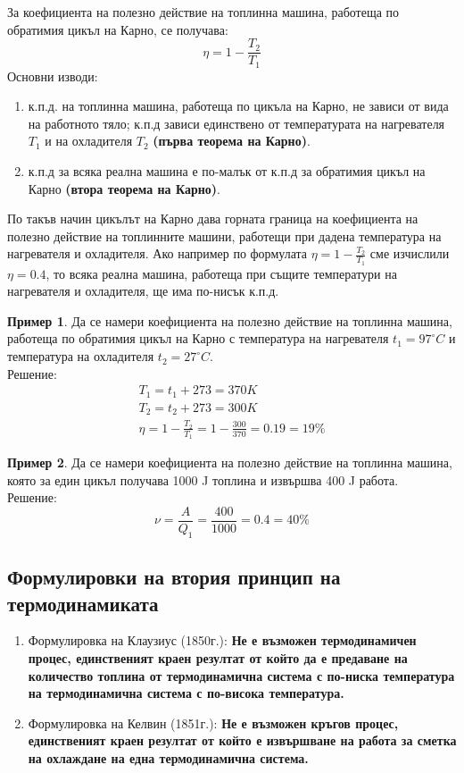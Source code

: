\documentclass[fleqn, 12pt]{article}
\theoremstyle{definition}
\newtheorem{example}{Пример}[subsection]
\begin{document}
За коефициента на полезно действие на топлинна машина, работеща по обратимия цикъл на Карно, се получава: 
$$\eta = 1 - \frac{T_2}{T_1}$$
Основни изводи: 
\begin{enumerate}
\item к.п.д. на топлинна машина, работеща по цикъла на Карно, не зависи от вида на
работното тяло; к.п.д зависи единствено от температурата на нагревателя $T_1$ и на
охладителя $T_2$ \textbf{(първа теорема на Карно)}.
\item к.п.д за всяка реална машина е по-малък от к.п.д за обратимия цикъл на Карно \textbf{(втора теорема на Карно)}.
\end{enumerate}
По такъв начин цикълът на Карно дава горната граница на коефициента на
полезно действие на топлинните машини, работещи при дадена температура на
нагревателя и охладителя. Ако например по формулата $\eta = 1 - \frac{T_2}{T_1}$ сме изчислили $\eta = 0.4$, 
то всяка реална машина, работеща при същите температури на нагревателя и охладителя, ще има по-нисък к.п.д.

\begin{example}
Да се намери коефициента на полезно действие на топлинна машина,
работеща по обратимия цикъл на Карно с температура на нагревателя
$t_1 = 97^\circ C $ и температура на охладителя $t_2 = 27^\circ C$.\\
Решение: \\
\begin{gather*}
T_1 = t_1 + 273 = 370K \\
T_2 = t_2 + 273 = 300K \\
\eta = 1 - \frac{T_2}{T_1} = 1 - \frac{300}{370} = 0.19 = 19 \%
\end{gather*}
\end{example}

\begin{example}
Да се намери коефициента на полезно действие на топлинна машина, която 
за един цикъл получава 1000 J топлина и извършва 400 J работа.\\
Решение: \\
$$\nu = \frac{A}{Q_1} = \frac{400}{1000} = 0.4 = 40 \% $$
\end{example}

\subsection{Формулировки на втория принцип на термодинамиката}

\begin{enumerate}
\item Формулировка на Клаузиус (1850г.): \textbf{Не е възможен термодинамичен процес, 
единственият краен резултат от който да е предаване на количество топлина от
термодинамична система с по-ниска температура на термодинамична система с
по-висока температура.}
\item Формулировка на Келвин (1851г.): \textbf{Не е възможен кръгов процес,
единственият краен резултат от който е извършване на работа за сметка на
охлаждане на една термодинамична система.}
\end{enumerate}
\end{document}
